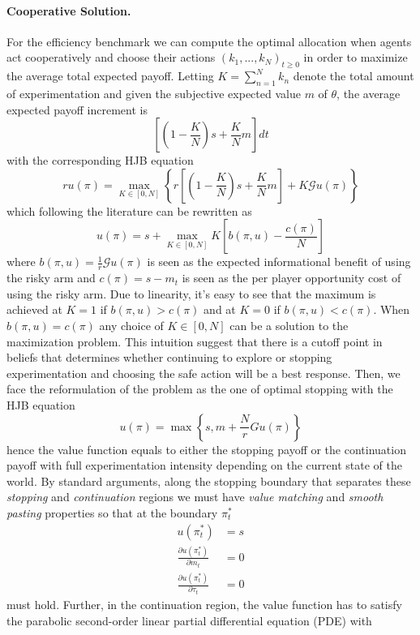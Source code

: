 \paragraph{Cooperative Solution.} For the efficiency benchmark we can compute the optimal allocation when agents act cooperatively and choose their actions $(k_1,...,k_N)_{t\geq 0}$ in order to maximize the average total expected payoff. Letting $K = \sum_{n=1}^{N}k_n$ denote the total amount of experimentation and given the subjective expected value $m$ of $\theta$, the average expected payoff increment is 
\[\left[\left(1- \frac{K}{N} \right)s + \frac{K}{N}m\right]dt\]
with the corresponding HJB equation
\[ ru(\pi) = \max_{K \in [0,N]} \left\{r\left[ \left( 1- \frac{K}{N} \right)s + \frac{K}{N}m \right] + K \mathcal{G} u(\pi) \right\}\] which following the literature can be rewritten as 
\[u(\pi) = s + \max_{K \in [0,N]} K \left[b(\pi, u) - \frac{c(\pi)}{N}\right]\]
where $b(\pi,u) = \frac{1}{r} \mathcal{G}u(\pi)$ is seen as the expected informational benefit of using the risky arm and $c(\pi) = s-m_t$ is seen as the per player opportunity cost of using the risky arm. Due to linearity, it's easy to see that the maximum is achieved at $K = 1$ if $b(\pi, u) > c(\pi)$ and at $K = 0$ if $b(\pi, u) < c(\pi)$. When $b(\pi, u) = c(\pi)$ any choice of $K \in [0,N]$ can be a solution to the maximization problem. This intuition suggest that there is a cutoff point in beliefs that determines whether continuing to explore or stopping experimentation and choosing the safe action will be a best response. Then, we face the reformulation of the problem as the one of optimal stopping with the HJB equation
\[ u(\pi) = \max \left\{ s, m + \frac{N}{r}Gu(\pi)\right\}\]
hence the value function equals to either the stopping payoff or the continuation payoff with full experimentation intensity depending on the current state of the world. By standard arguments, along the stopping boundary that separates these \textit{stopping} and \textit{continuation} regions we must have \textit{value matching} and \textit{smooth pasting} properties so that at the boundary $\pi_t^*$
\begin{align*}
    u(\pi_t^*) &= s \\
    \frac{\partial u(\pi_t^*)}{\partial m_t}  &= 0 \\
    \frac{\partial u(\pi_t^*)}{\partial \tau_t} &= 0
\end{align*}
must hold. Further, in the continuation region, the value function has to satisfy the parabolic second-order linear partial differential equation (PDE) with

